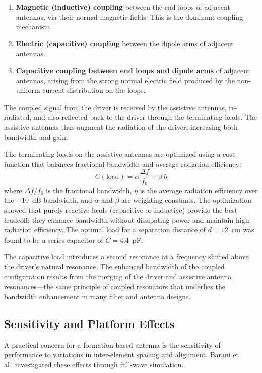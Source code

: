 \begin{enumerate}
\item \textbf{Magnetic (inductive) coupling} between the end loops of adjacent antennas, via their normal magnetic fields.  This is the dominant coupling mechanism.
\item \textbf{Electric (capacitive) coupling} between the dipole arms of adjacent antennas.
\item \textbf{Capacitive coupling between end loops and dipole arms} of adjacent antennas, arising from the strong normal electric field produced by the non-uniform current distribution on the loops.
\end{enumerate}

The coupled signal from the driver is received by the assistive antennas, re-radiated, and also reflected back to the driver through the terminating loads.  The assistive antennas thus augment the radiation of the driver, increasing both bandwidth and gain.

The terminating loads on the assistive antennas are optimized using a cost function that balances fractional bandwidth and average radiation efficiency:
%
\begin{equation}
C(\text{load}) = \alpha \frac{\Delta f}{f_0} + \beta \, \bar{\eta}
\end{equation}
%
where $\Delta f / f_0$ is the fractional bandwidth, $\bar{\eta}$ is the average radiation efficiency over the $-10$~dB bandwidth, and $\alpha$ and $\beta$ are weighting constants.  The optimization showed that purely reactive loads (capacitive or inductive) provide the best tradeoff: they enhance bandwidth without dissipating power and maintain high radiation efficiency.  The optimal load for a separation distance of $d = 12$~cm was found to be a series capacitor of $C = 4.4$~pF.

The capacitive load introduces a second resonance at a frequency shifted above the driver's natural resonance.  The enhanced bandwidth of the coupled configuration results from the merging of the driver and assistive antenna resonances---the same principle of coupled resonators that underlies the bandwidth enhancement in many filter and antenna designs.

\subsection{Sensitivity and Platform Effects}

A practical concern for a formation-based antenna is the sensitivity of performance to variations in inter-element spacing and alignment.  Barani et al.\ investigated these effects through full-wave simulation.

